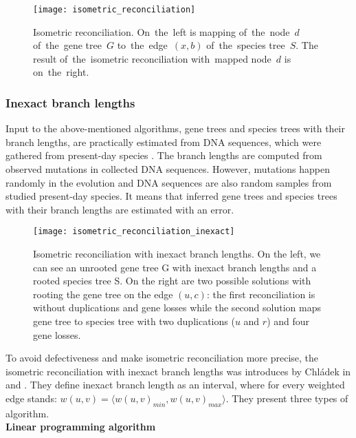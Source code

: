 \begin{figure}[ht]
	\centering
	\label{isometric_reconciliation}
  	\texttt{[image: isometric\_reconciliation]}
  	\caption[Isometric reconciliation]{Isometric reconciliation. On~the~left is mapping of~the~node~$d$ of~the~gene tree~$G$ to~the~edge~$(x, b)$ of~the~species tree~$S$. The result of~the~isometric reconciliation with~mapped node~$d$ is on~the~right.}
\end{figure}

\subsubsection{Inexact branch lengths} \label{Inexact_branch_lengths}

Input to the above-mentioned algorithms, gene trees and species trees with their branch lengths, are practically estimated from DNA sequences, which were gathered from present-day species \cite{felsenstein}. The branch lengths are computed from observed mutations in collected DNA sequences. However, mutations happen randomly in the evolution and DNA sequences are also random samples from studied present-day species. It means that inferred gene trees and species trees with their branch lengths are estimated with an error.

\begin{figure}[ht]
	\centering
	\label{isometric_reconciliation_inexact}
  	\texttt{[image: isometric\_reconciliation\_inexact]}
  	\caption[Isometric reconciliation with inexact branch lengths]{Isometric reconciliation with inexact branch lengths. On the left, we can see an unrooted gene tree G with inexact branch lengths and a rooted species tree S. On the right are two possible solutions with rooting the gene tree on the edge $(u, c)$: the first reconciliation is without duplications and gene losses while the second solution maps gene tree to species tree with two duplications ($u$ and $r$) and four gene losses.}
\end{figure}

To avoid defectiveness and make isometric reconciliation more precise, the isometric reconciliation with inexact branch lengths was introduces by Chládek in \cite{chladek_unpublished} and \cite{chladek_thesis}. They define inexact branch length as an interval, where for every weighted edge stands: $w(u, v) = \langle w(u, v)_{min}, w(u, v)_{max} \rangle$. They present three types of algorithm.\\
\textbf{Linear programming algorithm}

